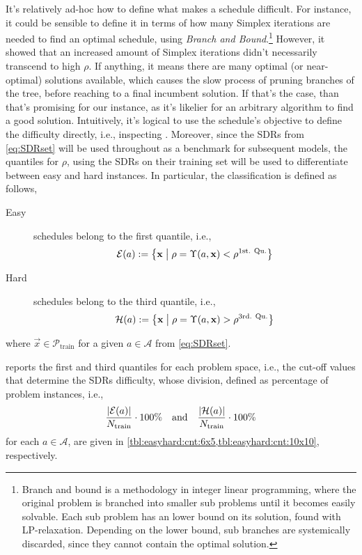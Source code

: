 It's relatively ad-hoc how to define what makes a schedule difficult. 
For instance, it could be sensible to define it in terms of how many Simplex 
iterations are needed to find an optimal schedule, using \emph{Branch and 
Bound}.\footnote{Branch and bound \citep{bnb} is a methodology in integer
    linear programming, where the original problem is branched into smaller sub 
    problems until it becomes easily solvable. Each sub problem has an lower 
    bound on its solution, found with LP-relaxation. Depending on the lower 
    bound, sub branches are systemically discarded, since they cannot contain 
    the optimal solution.} 
However, it showed that an increased amount of Simplex iterations 
didn't necessarily transcend to high $\rho$. 
If anything, it means there are many optimal (or near-optimal) solutions 
available, which causes the slow process of pruning branches of the tree, 
before reaching to a final incumbent solution. If that's the case, than that's 
promising for our instance, as it's likelier for an arbitrary algorithm to find 
a good solution. 
Intuitively, it's logical to use the schedule's objective to define the 
difficulty directly, i.e., inspecting \namerho. Moreover, since the SDRs from 
\cref{eq:SDRset} will be used throughout as a benchmark for subsequent models, 
the quantiles for $\rho$, using the SDRs on their training set will be used 
to differentiate between easy and hard instances. In particular, the 
classification is defined as follows, 
\begin{description}
  \item[Easy] schedules belong to the first quantile, i.e., \hfill \\
  \begin{equation}\label{eq:easy}
    \mathcal{E}(a):=\condset{\vec{x}}{
      \rho=\Upsilon(a,\vec{x})<\rho^{\text{1st. Qu.}}}
  \end{equation} 
  \item[Hard] schedules belong to the third quantile, i.e., \hfill \\
  \begin{equation}\label{eq:hard}
    \mathcal{H}(a):=\condset{\vec{x}}{
      \rho=\Upsilon(a,\vec{x})>\rho^{\text{3rd. Qu.}}}
  \end{equation} 
\end{description}
where $\vec{x}\in\mathcal{P}_{\text{train}}$ for a given $a\in\mathcal{A}$ from 
\cref{eq:SDRset}.

 

 reports the first and third quantiles for each 
problem space, i.e., the cut-off values that determine the SDRs difficulty, 
whose division, defined as percentage of problem instances, i.e., 
\begin{equation}\label{eq:easyhard:cnt}
  \frac{\abs{\mathcal{E}(a)}}{N_{\text{train}}} \cdot 100\%
  \quad \text{and} \quad 
  \frac{\abs{\mathcal{H}(a)}}{N_{\text{train}}}\cdot 100\%
\end{equation}
for each $a\in\mathcal{A}$, are given in \cref{tbl:easyhard:cnt:6x5,tbl:easyhard:cnt:10x10}, respectively. 

